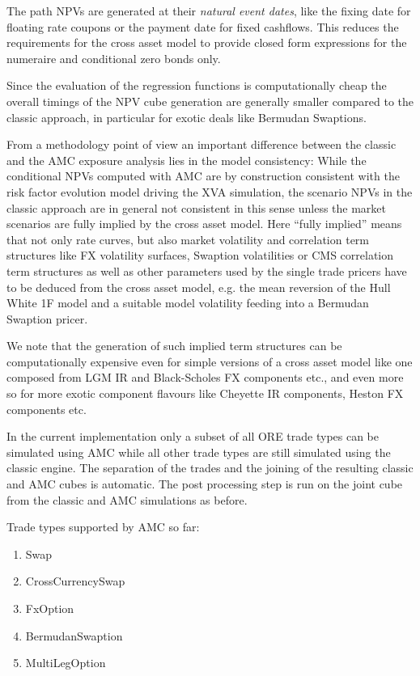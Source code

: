 \documentclass[12pt, a4paper]{article}
\begin{document}
{\begin{appendix}
The path NPVs are generated at their {\em natural event dates}, like the fixing date for floating rate coupons or the
payment date for fixed cashflows. This reduces the requirements for the cross asset model to provide closed form
expressions for the numeraire and conditional zero bonds only.

Since the evaluation of the regression functions is computationally cheap the overall timings of the NPV cube generation
are generally smaller compared to the classic approach, in particular for exotic deals like Bermudan Swaptions.

From a methodology point of view an important difference between the classic and the AMC exposure analysis lies in the
model consistency: While the conditional NPVs computed with AMC are by construction consistent with the risk factor
evolution model driving the XVA simulation, the scenario NPVs in the classic approach are in general not consistent in
this sense unless the market scenarios are fully implied by the cross asset model. Here ``fully implied'' means that not
only rate curves, but also market volatility and correlation term structures like FX volatility surfaces, Swaption
volatilities or CMS correlation term structures as well as other parameters used by the single trade pricers have to be
deduced from the cross asset model, e.g. the mean reversion of the Hull White 1F model and a suitable model volatility
feeding into a Bermudan Swaption pricer.

We note that the generation of such implied term structures can be computationally expensive even for simple versions of
a cross asset model like one composed from LGM IR and Black-Scholes FX components etc., and even more so for more exotic
component flavours like Cheyette IR components, Heston FX components etc.

In the current implementation only a subset of all ORE trade types can be simulated using AMC while all other trade types
are still simulated using the classic engine. The separation of the trades and the joining of the resulting classic and AMC
cubes is automatic. The post processing step is run on the joint cube from the classic and AMC simulations as before.

Trade types supported by AMC so far:
\begin{enumerate}
\item Swap
\item CrossCurrencySwap
\item FxOption
\item BermudanSwaption
\item MultiLegOption
\end{enumerate}


\end{appendix}}
\end{document}
